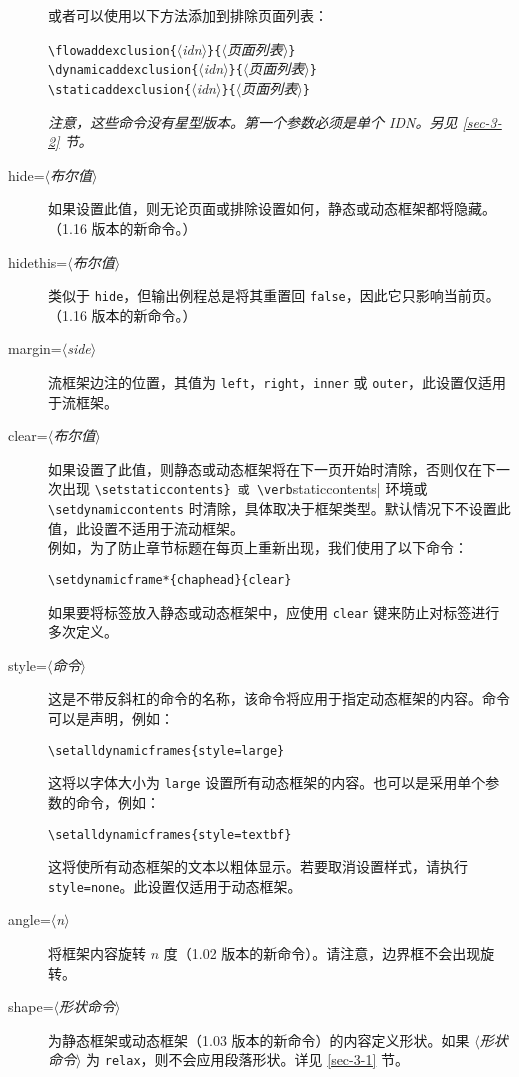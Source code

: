 \documentclass[a4paper]{book}%
\newcommand{\meta}[1]{\textnormal{\ensuremath{\langle}\makebox[0pt][l]{}\emph{#1}\makebox[0pt][l]{}\ensuremath{\rangle}}}
\newcommand{\cmd}[1]{\texttt{#1}}
\begin{document}
\begin{description}
\begin{mdframed}
    \end{mdframed}
    或者可以使用以下方法添加到排除页面列表：
    \begin{mdframed}
        \verb|\flowaddexclusion{|\meta{idn}\verb|}{|\meta{页面列表}\verb|}|\\
        \verb|\dynamicaddexclusion{|\meta{idn}\verb|}{|\meta{页面列表}\verb|}|\\
        \verb|\staticaddexclusion{|\meta{idn}\verb|}{|\meta{页面列表}\verb|}|
    \end{mdframed}
    \emph{注意，这些命令没有星型版本。第一个参数必须是单个 IDN。另见 \ref{sec-3-2} 节。}
    \item[hide=\meta{布尔值}] 如果设置此值，则无论页面或排除设置如何，静态或动态框架都将隐藏。（1.16 版本的新命令。）
    \item[hidethis=\meta{布尔值}] 类似于 \cmd{hide}，但输出例程总是将其重置回 \cmd{false}，因此它只影响当前页。（1.16 版本的新命令。）
    \item[margin=\meta{side}] 流框架边注的位置，其值为 \cmd{left}，\cmd{right}，\cmd{inner} 或 \cmd{outer}，此设置仅适用于流框架。
    \item[clear=\meta{布尔值}] 如果设置了此值，则静态或动态框架将在下一页开始时清除，否则仅在下一次出现 \verb|\setstaticcontents} 或 \verb|staticcontents| 环境或 \verb|\setdynamiccontents| 时清除，具体取决于框架类型。默认情况下不设置此值，此设置不适用于流动框架。\\
    例如，为了防止章节标题在每页上重新出现，我们使用了以下命令：
\begin{lstlisting}[backgroundcolor=\color{white}]
\setdynamicframe*{chaphead}{clear}
\end{lstlisting}
    如果要将标签放入静态或动态框架中，应使用 \cmd{clear} 键来防止对标签进行多次定义。
    \item[style=\meta{命令}] 这是不带反斜杠的命令的名称，该命令将应用于指定动态框架的内容。命令可以是声明，例如：
    \begin{mdframed}[backgroundcolor=white]
        \verb|\setalldynamicframes{style=large}|
    \end{mdframed}
    这将以字体大小为 \cmd{large} 设置所有动态框架的内容。也可以是采用单个参数的命令，例如：
    \begin{mdframed}[backgroundcolor=white]
        \verb|\setalldynamicframes{style=textbf}|
    \end{mdframed}
    这将使所有动态框架的文本以粗体显示。若要取消设置样式，请执行 \cmd{style=none}。此设置仅适用于动态框架。
    \item[angle=\meta{n}] 将框架内容旋转 $n$ 度（1.02 版本的新命令）。请注意，边界框不会出现旋转。
    \item[shape=\meta{形状命令}] 为静态框架或动态框架（1.03 版本的新命令）的内容定义形状。如果 \meta{形状命令} 为 \cmd{relax}，则不会应用段落形状。详见 \ref{sec-3-1} 节。
\end{description}
\end{document}
